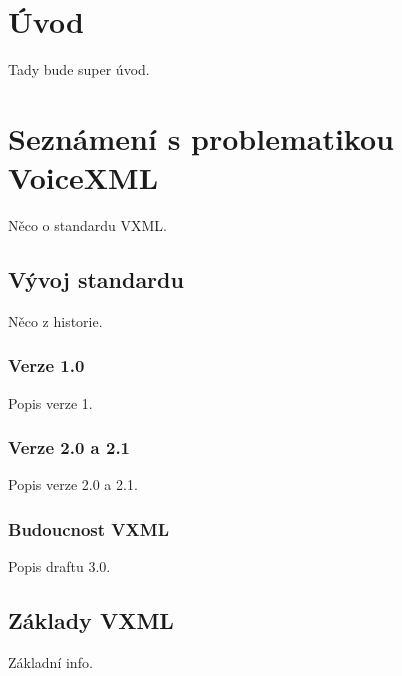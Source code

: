 \documentclass[ing,male,java,dept460]{diploma}						%
\begin{document}
\MakeTitlePages

\tableofcontents
\cleardoublepage	%

\listoftables
\cleardoublepage	%

\listoffigures
\cleardoublepage	%


\lstlistoflistings
\cleardoublepage	%



\section{Úvod}
\label{sec:Uvod}
Tady bude super úvod.

\section{Seznámení s problematikou VoiceXML}
\label{sec:Seznameni_s_vxml}
Něco o standardu VXML.

\subsection{Vývoj standardu}
Něco z historie.

\subsubsection{Verze 1.0}
Popis verze 1.

\subsubsection{Verze 2.0 a 2.1}
Popis verze 2.0 a 2.1.

\subsubsection{Budoucnost VXML}
Popis draftu 3.0.

\subsection{Základy VXML}
\label{sec:Zaklady_vxml}
Základní info.
\end{document}
